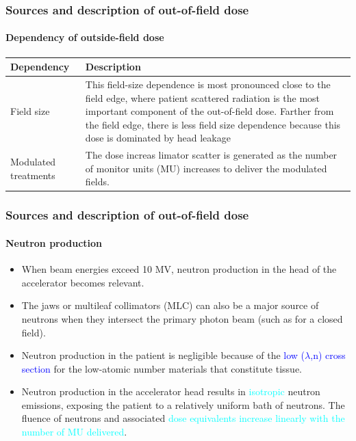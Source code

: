 \documentclass{beamer}
\begin{document}
\begin{frame}
  \frametitle{Sources and description of out-of-field dose}
  \framesubtitle{Dependency of outside-field dose}
  \begin{table}
    \centering
    \begin{tabular}{p{2cm}|p{9cm}}
      \hline\hline
      Dependency & Description \\
      \hline 
      Field size & This field-size dependence is most pronounced close to the field edge, where patient scattered radiation is the most important component of the out-of-field dose. Farther from the field edge, there is less field size dependence because this dose is dominated by head leakage\\ \hline
      Modulated treatments & The dose increas limator scatter is generated as the number of monitor units (MU) increases to deliver the modulated fields. \\ \hline\hline
      
    \end{tabular}
  \end{table}
\end{frame}


\begin{frame}
  \frametitle{Sources and description of out-of-field dose}
  \framesubtitle{Neutron production}
      \begin{itemize}
        \justifying
        \item When beam energies exceed 10 MV, neutron production in the head of the accelerator becomes relevant.
        \item The jaws or multileaf collimators (MLC) can also be a major source of neutrons when they intersect the primary photon beam (such as for a closed field).
        \item Neutron production in the patient is negligible because of the \textcolor{blue}{low ($\lambda$,n) cross section} for the low-atomic number materials that constitute tissue.
        \item Neutron production in the accelerator head results in \textcolor{cyan}{isotropic} neutron emissions, exposing the patient to a relatively uniform bath of neutrons. The fluence of neutrons and associated \textcolor{cyan}{dose equivalents increase linearly with the number of MU delivered}.
	\end{itemize}    
\end{frame}
\end{document}
